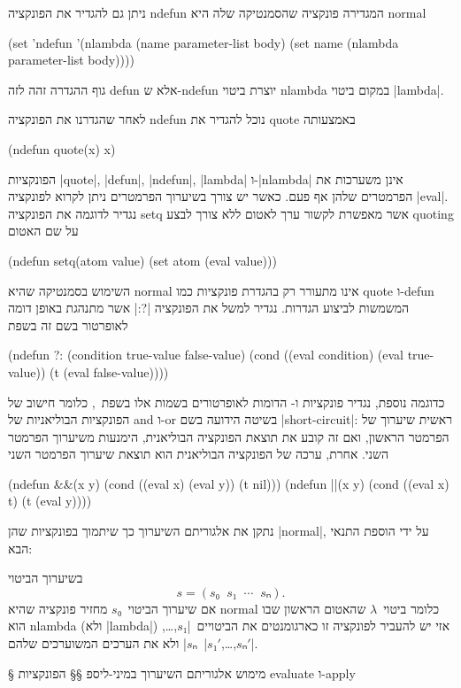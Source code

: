 ניתן גם להגדיר את הפונקציה ndefun המגדירה פונקציה שהסמנטיקה שלה היא normal
\begin{LIBRARY}
(set 'ndefun
  '(nlambda (name parameter-list body)
    (set name (nlambda parameter-list body))))
\end{LIBRARY}
גוף ההגדרה זהה לזה defun אלא ש-ndefun יוצרת ביטוי nlambda במקום ביטוי
\E|lambda|.

לאחר שהגדרנו את הפונקציה ndefun נוכל להגדיר את quote באמצעותה
\begin{LISP}
(ndefun quote(x) x)
\end{LISP}
הפונקציות \E|quote|, \E|defun|, \E|ndefun|, \E|lambda| ו-\E|nlambda| אינן
משערכות את הפרמטרים שלהן אף פעם. כאשר יש צורך בשיערוך הפרמטרים ניתן לקרוא
לפונקציה \E|eval|. נגדיר לדוגמה את הפונקציה setq אשר מאפשרת לקשור ערך לאטום ללא
צורך לבצע quoting על שם האטום
\begin{LISP}
(ndefun setq(atom value)
  (set atom (eval value)))
\end{LISP}
השימוש בסמנטיקה שהיא normal אינו מתעורר רק בהגדרת פונקציות כמו quote ו-defun
המשמשות לביצוע הגדרות. נגדיר למשל את הפונקציה \T|?:| אשר מתנהגת באופן דומה
לאופרטור בשם זה בשפת~\CPL
\begin{LISP}
(ndefun ?: (condition true-value false-value)
  (cond ((eval condition) (eval true-value))
        (t (eval false-value))))
\end{LISP}
כדוגמה נוספת, נגדיר פונקציות \lisp{||} ו-\lisp{&&} הדומות לאופרטורים בשמות אלו
בשפת~\CPL, כלומר חישוב של הפונקציות הבוליאניות של and ו-or בשיטה הידועה בשם
\E|short-circuit|: ראשית שיערוך של הפרמטר הראשון, ואם זה קובע את תוצאת הפונקציה
הבוליאנית, הימנעות משיערוך הפרמטר השני. אחרת, ערכה של הפונקציה הבוליאנית הוא תוצאת
שיערוך הפרמטר השני
\begin{LISP}
(ndefun &&(x y)
  (cond ((eval x) (eval y))
        (t nil)))
(ndefun ||(x y)
  (cond ((eval x) t)
        (t (eval y))))
\end{LISP}

נתקן את אלגוריתם השיערוך כך שיתמוך בפונקציות שהן \E|normal|, על ידי הוספת התנאי
הבא:
\begin{mdframed}[backgroundcolor=Lavender!20]
  בשיערוך הביטוי \[
    s=(s₀\;\;s₁\;\;⋯\;\;sₙ).
  \] אם שיערוך הביטוי~$s₀$ מחזיר פונקציה שהיא
  normal כלומר ביטוי~$λ$ שהאטום הראשון שבו הוא nlambda (ולא \E|lambda|) אזי יש
  להעביר לפונקציה זו כארגומנטים את הביטויים~\E|$s₁$,…,$sₙ$| ולא את הערכים
  המשוערכים שלהם~\E|$s₁'$,…,$sₙ'$|.
\end{mdframed}

§ מימוש אלגוריתם השיערוך במיני-ליספ
§§ הפונקציות evaluate ו-apply

